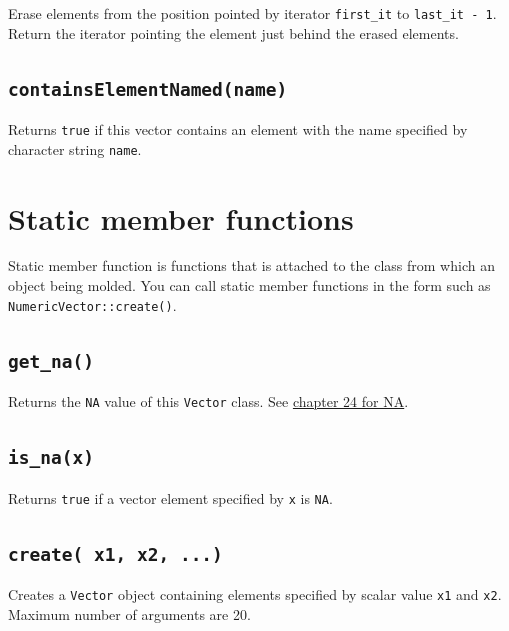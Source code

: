 \documentclass[]{book}
\begin{document}
Erase elements from the position pointed by iterator \texttt{first\_it} to \texttt{last\_it\ -\ 1}. Return the iterator pointing the element just behind the erased elements.

\hypertarget{containselementnamedname}{%
\subsection{\texorpdfstring{\texttt{containsElementNamed(name)}}{containsElementNamed(name)}}\label{containselementnamedname}}

Returns \texttt{true} if this vector contains an element with the name specified by character string \texttt{name}.

\hypertarget{static-member-functions}{%
\section{Static member functions}\label{static-member-functions}}

Static member function is functions that is attached to the class from which an object being molded.
You can call static member functions in the form such as \texttt{NumericVector::create()}.

\hypertarget{get_na}{%
\subsection{\texorpdfstring{\texttt{get\_na()}}{get\_na()}}\label{get_na}}

Returns the \texttt{NA} value of this \texttt{Vector} class. See \href{240_na_nan_inf.html}{chapter 24 for NA}.

\hypertarget{is_nax}{%
\subsection{\texorpdfstring{\texttt{is\_na(x)}}{is\_na(x)}}\label{is_nax}}

Returns \texttt{true} if a vector element specified by \texttt{x} is \texttt{NA}.

\hypertarget{create-x1-x2-...}{%
\subsection{\texorpdfstring{\texttt{create(\ x1,\ x2,\ ...)}}{create( x1, x2, ...)}}\label{create-x1-x2-...}}

Creates a \texttt{Vector} object containing elements specified by scalar value \texttt{x1} and \texttt{x2}. Maximum number of arguments are 20.
\end{document}
